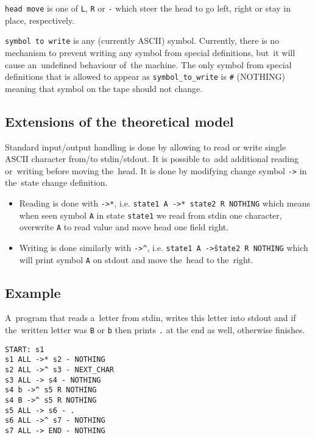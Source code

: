 \documentclass[english,shortabstract,mgr]{iithesis}
\begin{document}
\texttt{head move} is one of \texttt{L}, \texttt{R} or \texttt{-} which
steer the head to go left, right or stay in place, respectively.

\texttt{symbol to write} is any (currently ASCII) symbol. Currently, there
is no mechanism to prevent writing any symbol from special definitions,
but~it will cause an~undefined behaviour of~the machine. The only symbol
from special definitions that is allowed to appear as \texttt{symbol\_to\_write}
is \texttt{\#} (NOTHING) meaning that symbol on the tape should not change.

\subsection {Extensions of the theoretical model}

Standard input/output handling is done by allowing to read or write single
ASCII character from/to stdin/stdout. It is possible to~add additional
reading or~writing before moving the~head. It is done by modifying change
symbol \texttt{->} in the~state change definition.
\begin{itemize}
  \item Reading is done with \texttt{->*}, i.e. \texttt{state1 A ->* state2 R NOTHING}
        which means when seen symbol \texttt{A} in state \texttt{state1} we read
        from stdin one character, overwrite \texttt{A} to read value and move
        head one field right.
  \item Writing is done similarly with \texttt{->\^},
        i.e. \texttt{state1 A ->\^ state2 R NOTHING} which will print symbol
        \texttt{A} on stdout and move the~head to the~right.
\end{itemize}

\subsection{Example}

A~program that reads a~letter from stdin, writes this letter into
stdout and if the~written letter was \texttt{B} or \texttt{b} then prints
\texttt{.} at the end as well, otherwise finishes.

\begin{verbatim}
START: s1
s1 ALL ->* s2 - NOTHING
s2 ALL ->^ s3 - NEXT_CHAR
s3 ALL -> s4 - NOTHING
s4 b ->^ s5 R NOTHING
s4 B ->^ s5 R NOTHING
s5 ALL -> s6 - .
s6 ALL ->^ s7 - NOTHING
s7 ALL -> END - NOTHING
\end{verbatim}
\end{document}

